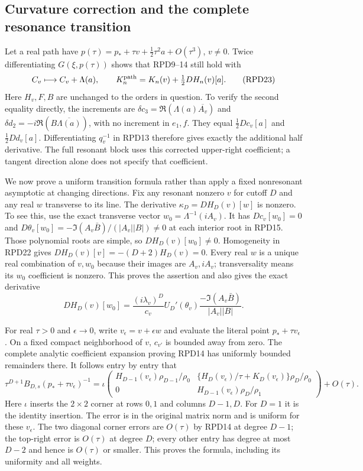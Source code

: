 \subsection{Curvature correction and the complete resonance transition}

Let a real path have
$p(\tau)=p_*+\tau v+\tfrac12\tau^2a+O(\tau^3)$, $v\ne0$.
Twice differentiating $G(\xi,p(\tau))$ shows that RPD9--14 still
hold with
\[
 C_v\longmapsto C_v+\Lambda(a),\qquad
 K_n^{\rm path}=K_n(v)+\tfrac12 DH_n(v)[a].\tag{RPD23}
\]
Here $H_v,F,B$ are unchanged to the orders in question.
To verify the second equality directly, the increments are
$\delta c_3=\Re(\Lambda(a)\overline{A_v})$
and $\delta d_2=-i\Re(B\overline{\Lambda(a)})$, with no increment
in $e_1,f$.  They equal $\tfrac12 Dc_v[a]$ and
$\tfrac12 Dd_v[a]$.  Differentiating $q_v^{-1}$ in RPD13 therefore
gives exactly the additional half derivative.  The full resonant
block uses this corrected upper-right coefficient; a tangent
direction alone does not specify that coefficient.

We now prove a uniform transition formula rather than apply a
fixed nonresonant asymptotic at changing directions.  Fix any
resonant nonzero $v$ for cutoff $D$ and any real $w$ transverse to
its line.  The derivative
$\kappa_D=DH_D(v)[w]$ is nonzero.  To see this, use the exact
transverse vector $w_0=\Lambda^{-1}(iA_v)$.
It has $Dc_v[w_0]=0$ and
$D\theta_v[w_0]=-\Im(A_v\bar B)/(|A_v||B|)\ne0$ at each
interior root in RPD15.  Those polynomial roots are simple, so
$DH_D(v)[w_0]\ne0$.  Homogeneity in RPD22 gives
$DH_D(v)[v]=-(D+2)H_D(v)=0$.
Every real $w$ is a unique real combination of $v,w_0$ because
their images are $A_v,iA_v$; transversality means its $w_0$
coefficient is nonzero.  This proves the assertion and also gives
the exact derivative
\[
 DH_D(v)[w_0]=\frac{(i\lambda_v)^D}{c_v}
 U_D'(\theta_v)\frac{-\Im(A_v\bar B)}{|A_v||B|}.\tag{RPD24}
\]

For real $\tau>0$ and $\epsilon\to0$, write
$v_\epsilon=v+\epsilon w$ and evaluate the literal point
$p_*+\tau v_\epsilon$.  On a fixed compact neighborhood of $v$,
$c_{v'}$ is bounded away from zero.  The complete analytic
coefficient expansion proving RPD14 has uniformly bounded
remainders there.  It follows entry by entry that
\[
 \tau^{D+1}B_{D,s}(p_*+\tau v_\epsilon)^{-1}
 =\iota\begin{pmatrix}
 H_{D-1}(v_\epsilon)\rho_{D-1}/\rho_0&
 \{H_D(v_\epsilon)/\tau+K_D(v_\epsilon)\}\rho_D/\rho_0\\
 0&H_{D-1}(v_\epsilon)\rho_D/\rho_1
 \end{pmatrix}+O(\tau).
 \tag{RPD25}
\]
Here $\iota$ inserts the $2\times2$ corner at rows $0,1$ and columns
$D-1,D$.  For $D=1$ it is the identity insertion.  The error is in
the original matrix norm and is uniform for these $v_\epsilon$.
The two diagonal corner errors are $O(\tau)$ by RPD14 at degree
$D-1$; the top-right error is $O(\tau)$ at degree $D$; every other
entry has degree at most $D-2$ and hence is $O(\tau)$ or smaller.
This proves the formula, including its uniformity and all weights.

